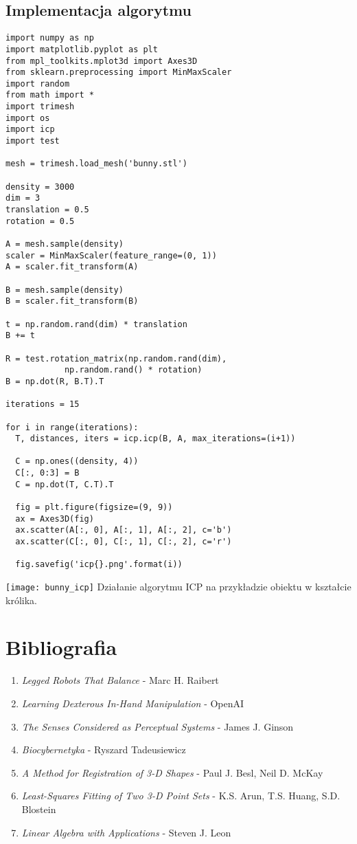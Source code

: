 \documentclass[12pt]{article}
\begin{document}
\subsection{Implementacja algorytmu}
\begin{verbatim}
import numpy as np
import matplotlib.pyplot as plt
from mpl_toolkits.mplot3d import Axes3D
from sklearn.preprocessing import MinMaxScaler
import random
from math import *
import trimesh
import os
import icp
import test

mesh = trimesh.load_mesh('bunny.stl')

density = 3000
dim = 3
translation = 0.5
rotation = 0.5

A = mesh.sample(density)
scaler = MinMaxScaler(feature_range=(0, 1))
A = scaler.fit_transform(A)

B = mesh.sample(density)
B = scaler.fit_transform(B)

t = np.random.rand(dim) * translation
B += t

R = test.rotation_matrix(np.random.rand(dim), 
			np.random.rand() * rotation)
B = np.dot(R, B.T).T

iterations = 15

for i in range(iterations):
  T, distances, iters = icp.icp(B, A, max_iterations=(i+1))

  C = np.ones((density, 4))
  C[:, 0:3] = B
  C = np.dot(T, C.T).T

  fig = plt.figure(figsize=(9, 9))
  ax = Axes3D(fig)
  ax.scatter(A[:, 0], A[:, 1], A[:, 2], c='b')
  ax.scatter(C[:, 0], C[:, 1], C[:, 2], c='r')

  fig.savefig('icp{}.png'.format(i))
\end{verbatim}

\texttt{[image: bunny\_icp]}
Działanie algorytmu ICP na przykładzie obiektu w kształcie królika.

\section{Bibliografia}
\begin{enumerate}
\item \emph{Legged Robots That Balance} - Marc H. Raibert
\item \emph{Learning Dexterous In-Hand Manipulation} - OpenAI
\item \emph{The Senses Considered as Perceptual Systems} - James J. Ginson
\item \emph{Biocybernetyka} - Ryszard Tadeusiewicz
\item \emph{A Method for Registration of 3-D Shapes} - Paul J. Besl, Neil D. McKay
\item \emph{Least-Squares Fitting of Two 3-D Point Sets} - K.S. Arun, T.S. Huang, S.D. Blostein
\item \emph{Linear Algebra with Applications} - Steven J. Leon
\end{enumerate}
\end{document}
